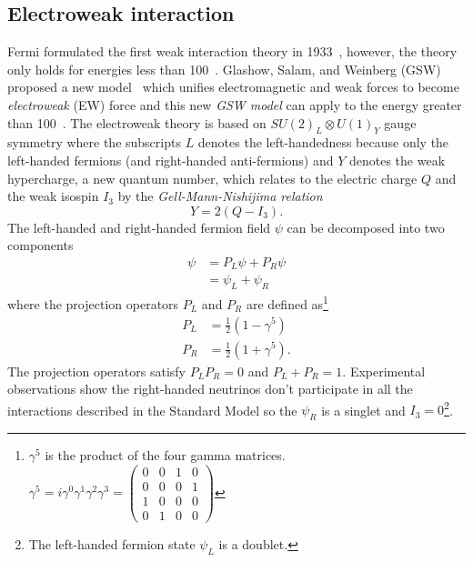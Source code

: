 
\subsection{Electroweak interaction}
\label{subsec:sm_ewk_interaction}
Fermi formulated the first weak interaction theory in 1933~\cite{BF01351864}, however, the theory only holds for energies less than 100~{\GeV}.
Glashow, Salam, and Weinberg (GSW) proposed a new model~\cite{BF02726525,PhysRevLett.19.1264,0029-55826190469-2} which unifies electromagnetic and weak forces to become \textit{electroweak} (EW) force and this new \textit{GSW model} can apply to the energy greater than 100~{\GeV}.
The electroweak theory is based on $SU(2)_{L} \otimes U(1)_{Y}$ gauge symmetry where the subscripts $L$ denotes the left-handedness because only the left-handed fermions (and right-handed anti-fermions) and $Y$ denotes the weak hypercharge, a new quantum number, which relates to the electric charge $Q$ and the weak isospin $I_{3}$ by the \textit{Gell-Mann-Nishijima relation}~\cite{PTP.10.581,BF02748000}
%
\begin{equation}
Y = 2(Q - I_{3}).
\label{eq:sm_hypercharge}
\end{equation}
%
The left-handed and right-handed fermion field $\psi$ can be decomposed into two components
%
\begin{align}
\psi & = P_{L}\psi + P_{R}\psi\\
     & = \psi_{L} + \psi_{R}
\label{eq:sm_fermion_field_components}
\end{align}
%
where the projection operators $P_{L}$ and $P_{R}$ are defined as\footnote{$\gamma^{5}$ is the product of the four gamma matrices. $\gamma^{5} = i \gamma^{0} \gamma^{1} \gamma^{2} \gamma^{3} = \left(\begin{matrix}0 & 0 & 1 & 0\\0 & 0 & 0 & 1\\1 & 0 & 0 & 0\\0 & 1 & 0 & 0\end{matrix}\right)$}
%
\begin{align}
P_{L} & = \frac{1}{2} (1 - \gamma^{5})\\
P_{R} & = \frac{1}{2} (1 + \gamma^{5}).
\label{eq:sm_projection_operators}
\end{align}
%
The projection operators satisfy $P_{L}P_{R} = 0$ and $P_{L} + P_{R} = 1$.
Experimental observations show the right-handed neutrinos don't participate in all the interactions described in the Standard Model so the $\psi_{R}$ is a singlet and $I_{3} = 0$\footnote{The left-handed fermion state $\psi_{L}$ is a doublet.}.
